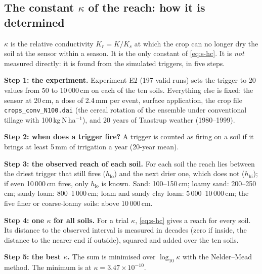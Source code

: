 \subsection{The constant $\kappa$ of the reach: how it is determined}
\begin{problem}[title={What $\kappa$ is}]
$\kappa$ is the relative conductivity $K_r=K/K_s$ at which the crop can no longer dry the soil at the sensor within a season. It is the only constant of \cref{eq:s-hc}. It is \emph{not} measured directly: it is found from the simulated triggers, in five steps.
\end{problem}
\begin{derivation}[title={How $\kappa$ was determined, step by step}]
\textbf{Step 1: the experiment.} Experiment E2 (197 valid runs) sets the trigger to 20 values from 50 to 10\,000\,cm on each of the ten soils. Everything else is fixed: the sensor at 20\,cm, a dose of 2.4\,mm per event, surface application, the crop file \texttt{crops\_conv\_N100.dai} (the cereal rotation of the ensemble under conventional tillage with 100\,kg\,N\,ha$^{-1}$), and 20 years of Taastrup weather (1980--1999).

\textbf{Step 2: when does a trigger fire?} A trigger is counted as firing on a soil if it brings at least 5\,mm of irrigation a year (20-year mean).

\textbf{Step 3: the observed reach of each soil.} For each soil the reach lies between the driest trigger that still fires ($h_{\mathrm{lo}}$) and the next drier one, which does not ($h_{\mathrm{hi}}$); if even 10\,000\,cm fires, only $h_{\mathrm{lo}}$ is known. Sand: 100--150\,cm; loamy sand: 200--250\,cm; sandy loam: 800--1\,000\,cm; loam and sandy clay loam: 5\,000--10\,000\,cm; the five finer or coarse-loamy soils: above 10\,000\,cm.

\textbf{Step 4: one $\kappa$ for all soils.} For a trial $\kappa$, \cref{eq:s-hc} gives a reach for every soil. Its distance to the observed interval is measured in decades (zero if inside, the distance to the nearer end if outside), squared and added over the ten soils.

\textbf{Step 5: the best $\kappa$.} The sum is minimised over $\log_{10}\kappa$ with the Nelder--Mead method. The minimum is at $\kappa=3.47\times10^{-10}$.
\end{derivation}
